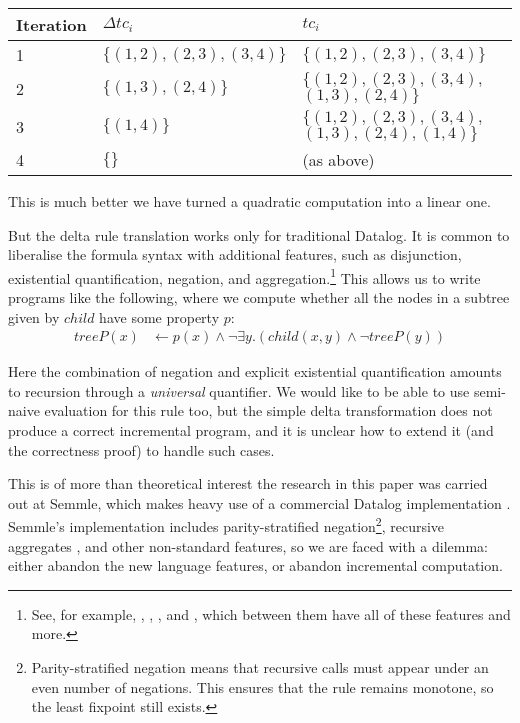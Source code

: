 \begin{center}
  \begin{tabular} {p{3.5em} p{8em} p{10em}}
    Iteration & $\Delta tc_i$ & $tc_i$ \\
    \toprule
    1 & $\{ (1, 2), (2, 3), (3, 4) \}$ & $\{ (1, 2), (2, 3), (3, 4) \}$\\
    2 & $\{ (1, 3), (2, 4) \}$ & $\{ (1, 2), (2, 3), (3, 4),$ $(1, 3), (2, 4) \}$\\
    3 & $\{ (1, 4) \}$ & $\{ (1, 2), (2, 3), (3, 4),$ $(1, 3), (2, 4), (1, 4) \}$\\
    4 & $\{ \}$ & (as above) \\
    \bottomrule
  \end{tabular}
\end{center}
\medskip

This is much better \textemdash{} we have turned a quadratic computation into a linear one.

But the delta rule translation works only for traditional Datalog. It is common to
liberalise the formula syntax with additional features, such as disjunction,
existential quantification, negation, and aggregation.\footnote{ See, for
  example, \autocites(LogiQL)(){logicbloxWebsite}{halpin2014logiql},
  \autocites(Datomic)(){datomicWebsite},
  \autocites(Souffle)(){souffleWebsite}{scholz2016fast}, and
  \autocites(DES)(){saenz2011deductive}, which between them have all of these
  features and more. } 
This allows us to write programs like the following, where we compute whether all the
nodes in a subtree given by $child$ have some property $p$:
\begin{align*}
  treeP(x) &\leftarrow p(x) \wedge \neg \exists y . (child(x,y) \wedge \neg treeP(y))
\end{align*}

Here the combination of negation and explicit existential quantification amounts
to recursion through a \emph{universal} quantifier. We would
like to be able to use semi-naive evaluation for this rule too, but the simple delta
transformation does not produce a correct incremental program, and it is unclear how to extend it (and the
correctness proof) to handle such cases.

This is of more than theoretical interest \textemdash{} the research
in this paper was carried out at Semmle, which
makes heavy use of a commercial Datalog implementation
\autocites{semmleWebsite}{avgustinov2016ql}{sereni2008adding}{schafer2010type}.
Semmle's implementation includes parity-stratified negation\footnote{Parity-stratified negation means that recursive calls must
  appear under an even number of negations. This ensures that the rule remains
  monotone, so the least fixpoint still exists.},
recursive aggregates \autocite{demoor2013aggregates}, and other non-standard
features, so we are faced with a dilemma: either abandon the new language
features, or abandon incremental computation.

